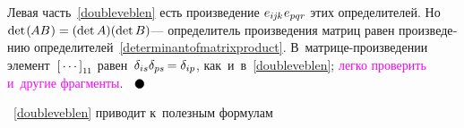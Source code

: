 \begin{otherlanguage}{russian}
\vspace{-0.1em}\noindent
Левая часть~\eqref{doubleveblen} есть произведение ${e_{i\hspace{-0.1ex}j\hspace{-0.1ex}k} \hspace{.1ex} e_{pqr}}$ этих определителей.
Но~${\operatorname{det} \hspace{.2ex} (\hspace{-0.1ex}AB\hspace{.1ex}) = (\operatorname{det} A)(\operatorname{det} B)}$\:--- определитель произведения матриц равен произведению определителей~\eqref{determinantofmatrixproduct}.
В~матрице\hbox{-}произведении элемент~${\left[{\,\cdots\,}\right]}_{1\hspace{-0.1ex}1}$ равен~${\delta_{is} \delta_{ps} \hspace{-0.2ex} = \delta_{ip}}$, как~и~в~\eqref{doubleveblen}; \textcolor{magenta}{легко проверить и~другие фрагменты}.
${ \hspace{.6em}
\tikz[baseline=-0.6ex] \draw [color=black, fill=black] (0, 0) circle (.8ex); }$

~\eqref{doubleveblen} приводит к~полезным формулам


\end{otherlanguage}
